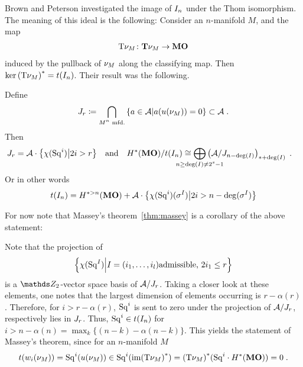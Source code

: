 Brown and Peterson investigated the image of $I_{n}$ under the Thom
isomorphism.
The meaning of this ideal is the following:
Consider an $n$-manifold $M$, and the map
\begin{gather*}
  \mathrm{T}\nu_{M}\colon\bm{\mathrm{T}}{\nu_{M}}\to\bm{\mathrm{MO}}
\end{gather*}
induced by the pullback of $\nu_{M}$ along the classifying map.
Then $\ker{(\mathrm{T}\nu_{M})}^* = t(I_{n})$.
Their result was the following.
\begin{Thm*}
  Define
  \begin{gather*}
    J_{r}
    \coloneqq \bigcap_{\text{$M^n$ mfd.}}
    \left\{ a\in\mathcal{A} \middle| a({u}(\nu_{M})) = 0 \right\}
    \subset \mathcal{A}
    \;.
  \end{gather*}
  Then
  \begin{align*}
    \J r
    &= \A \cdot \left\{\antipode(\Sq i) \middle| 2i>r\right\}
    &\text{and}&
    &\H^*(\MOspec)/\thomiso(\I n)
    &\cong \bigoplus_{\mathclap{n\geq\deg(I)\neq 2^s-1}}
      \left( \A / \J{n-\deg(I)} \right)_{*+\deg(I)}
      \;.
  \end{align*}
  Or in other words
  \begin{gather*}
    t(I_{n})
    = H^{*>n}(\bm{\mathrm{MO}})
    + \mathcal{A}\cdot \left\{
      \chi(\mathrm{Sq}^{i})(\sigma^I) \middle| 2i>n-\deg(\sigma^I)
    \right\}
  \end{gather*}
\end{Thm*}

For now note that Massey's theorem~\ref{thm:massey} is a corollary of
the above statement:
\begin{Rem*}
  Note that the projection of
  \begin{gather*}
    \left\{
      \chi(\mathrm{Sq}^{I}) \middle|
      I=(i_1,\dotsc,i_l) \text{admissible, } 2i_1\leq r
    \right\}
  \end{gather*}
  is a $\Zmod2$-vector space basis of $\mathcal{A}/J_{r}$.
  Taking a closer look at these elements, one notes that the
  largest dimension of elements occurring is $r-\alpha(r)$.
  Therefore, for $i>r-\alpha(r)$, $\mathrm{Sq}^{i}$ is sent to zero under the
  projection of $\mathcal{A}/J_{r}$, respectively lies in $J_{r}$.
  Thus, $\mathrm{Sq}^{i}\in t(I_{n})$ for
  $i>n-\alpha(n)=\max_k\{(n-k)-\alpha(n-k)\}$.
  This yields the statement of Massey's theorem, since for an
  $n$-manifold $M$
  \begin{gather*}
    t({w_{i}}(\nu_{M}))
    = \mathrm{Sq}^{i}({u}(\nu_{M}))
    \in \mathrm{Sq}^{i}(\mathrm{im}{(\mathrm{T}\nu_{M})}^*)
    = {(\mathrm{T}\nu_{M})}^* (\mathrm{Sq}^{i}\cdot H^*(\bm{\mathrm{MO}}))
    = 0
    \;.
  \end{gather*}
\end{Rem*}

